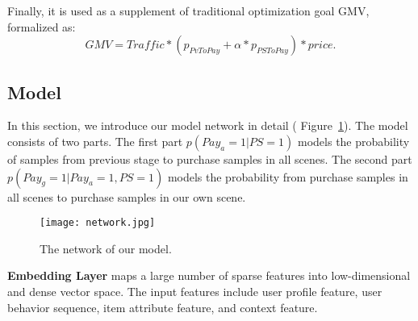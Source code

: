 \documentclass[sigconf]{acmart}
\begin{document}
\iffalse
The final formula modeling the probability from samples to positive sample of our scene which is defined as:
\begin{equation}
\begin{aligned}
    p_{DrrToPay} = & p(Pay=1|Drr=1) \\
                = & p(Pay_{all}=1|Drr=1) *  p(Pay_{gul}=1|Pay_{all}=1)
\end{aligned}
\end{equation}
\fi

Finally, it is used as a supplement of traditional optimization goal GMV, formalized as:
\begin{equation}
    GMV = Traffic * (p_{PvToPay} + \alpha * p_{PSToPay}) * price.
\end{equation}


\subsection{Model}

In this section, we introduce our model network in detail ( Figure~\ref{fig:network}).
The model consists of two parts. The first part $p(Pay_{a}=1|PS=1)$ models the probability of samples from previous stage to purchase samples in all scenes. The second part $p(Pay_{g}=1|Pay_{a}=1, PS=1)$ models the probability from purchase samples in all scenes to purchase samples in our own scene.

\begin{figure}
\centering
\texttt{[image: network.jpg]} 
\vskip -10pt
\caption{The network of our model.}   
\label{fig:network}     
\vskip -15pt
\end{figure}



\textbf{Embedding Layer} maps a large number of sparse features into low-dimensional and dense vector space. The input features include user profile feature, user behavior sequence, item attribute feature, and context feature.
\end{document}
